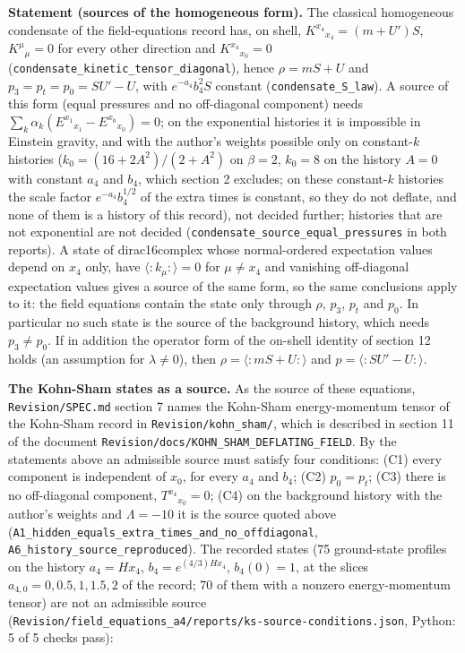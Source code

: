 \documentclass[11pt]{article}
\begin{document}
\textbf{Statement (sources of the homogeneous form).} The classical homogeneous condensate of the field-equations record has, on shell, $K^{x_4}{}_{x_4} = (m + U')S$, $K^\mu{}_\mu = 0$ for every other direction and $K^{x_4}{}_{x_0} = 0$ (\texttt{condensa\allowbreak{}te\_kinet\allowbreak{}ic\_tenso\allowbreak{}r\_diagon\allowbreak{}al}), hence $\rho = mS + U$ and $p_3 = p_t = p_0 = SU' - U$, with $e^{-a_4}b_4^2S$ constant (\texttt{condensa\allowbreak{}te\_S\_law}). A source of this form (equal pressures and no off-diagonal component) needs $\sum_k\alpha_k(E^{x_1}{}_{x_1} - E^{x_0}{}_{x_0}) = 0$; on the exponential histories it is impossible in Einstein gravity, and with the author's weights possible only on constant-$k$ histories ($k_0 = (16 + 2A^2)/(2 + A^2)$ on $\beta = 2$, $k_0 = 8$ on the history $A = 0$ with constant $a_4$ and $b_4$, which section 2 excludes; on these constant-$k$ histories the scale factor $e^{-a_4}b_4^{1/2}$ of the extra times is constant, so they do not deflate, and none of them is a history of this record), not decided further; histories that are not exponential are not decided (\texttt{condensa\allowbreak{}te\_sourc\allowbreak{}e\_equal\_\allowbreak{}pressure\allowbreak{}s} in both reports). A state of dirac16complex whose normal-ordered expectation values depend on $x_4$ only, have $\langle{:}k_\mu{:}\rangle = 0$ for $\mu \neq x_4$ and vanishing off-diagonal expectation values gives a source of the same form, so the same conclusions apply to it: the field equations contain the state only through $\rho$, $p_3$, $p_t$ and $p_0$. In particular no such state is the source of the background history, which needs $p_3 \neq p_0$. If in addition the operator form of the on-shell identity of section 12 holds (an assumption for $\lambda \neq 0$), then $\rho = \langle{:}mS + U{:}\rangle$ and $p = \langle{:}SU' - U{:}\rangle$.

\textbf{The Kohn-Sham states as a source.} As the source of these equations, \texttt{Revision\allowbreak{}/SPEC.md} section 7 names the Kohn-Sham energy-momentum tensor of the Kohn-Sham record in \texttt{Revision\allowbreak{}/kohn\_sh\allowbreak{}am/}, which is described in section 11 of the document \texttt{Revision\allowbreak{}/docs/KO\allowbreak{}HN\_SHAM\_\allowbreak{}DEFLATIN\allowbreak{}G\_FIELD}. By the statements above an admissible source must satisfy four conditions: (C1) every component is independent of $x_0$, for every $a_4$ and $b_4$; (C2) $p_0 = p_t$; (C3) there is no off-diagonal component, $T^{x_4}{}_{x_0} = 0$; (C4) on the background history with the author's weights and $\Lambda = -10$ it is the source quoted above (\texttt{A1\_hidde\allowbreak{}n\_equals\allowbreak{}\_extra\_t\allowbreak{}imes\_and\allowbreak{}\_no\_offd\allowbreak{}iagonal}, \texttt{A6\_histo\allowbreak{}ry\_sourc\allowbreak{}e\_reprod\allowbreak{}uced}). The recorded states (75 ground-state profiles on the history $a_4 = Hx_4$, $b_4 = e^{(4/3)Hx_4}$, $b_4(0) = 1$, at the slices $a_{4,0} = 0, 0.5, 1, 1.5, 2$ of the record; 70 of them with a nonzero energy-momentum tensor) are not an admissible source (\texttt{Revision\allowbreak{}/field\_e\allowbreak{}quations\allowbreak{}\_a4/repo\allowbreak{}rts/ks-s\allowbreak{}ource-co\allowbreak{}nditions\allowbreak{}.json}, Python: 5 of 5 checks pass):
\end{document}
